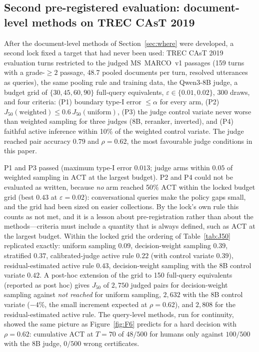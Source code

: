 \documentclass{article}
\newcommand{\eps}{\varepsilon}
\newcommand{\ACT}{\mathrm{ACT}}
\newcommand{\Jfifty}{J_{50}}
\begin{document}
\subsection{Second pre-registered evaluation: document-level methods on TREC CAsT 2019}
After the document-level methods of Section~\ref{sec:where} were developed, a second lock fixed a target that had never been used: TREC CAsT 2019 evaluation turns restricted to the judged MS~MARCO~v1 passages (159 turns with a grade-$\ge2$ passage, 48.7 pooled documents per turn, resolved utterances as queries), the same pooling rule and training data, the Qwen3-8B judge, a budget grid of $\{30,45,60,90\}$ full-query equivalents, $\eps\in\{0.01,0.02\}$, 300 draws, and four criteria: (P1) boundary type-I error $\le\alpha$ for every arm, (P2) $\Jfifty(\text{weighted})\le0.6\,\Jfifty(\text{uniform})$, (P3) the judge control variate never worse than weighted sampling for three judges (8B, reranker, inverted), and (P4) faithful active inference within 10\% of the weighted control variate. The judge reached pair accuracy $0.79$ and $\rho=0.62$, the most favourable judge conditions in this paper.

P1 and P3 passed (maximum type-I error $0.013$; judge arms within $0.05$ of weighted sampling in $\ACT$ at the largest budget). P2 and P4 could not be evaluated as written, because \emph{no} arm reached 50\% $\ACT$ within the locked budget grid (best $0.43$ at $\eps=0.02$): conversational queries make the policy gaps small, and the grid had been sized on easier collections. By the lock's own rule this counts as not met, and it is a lesson about pre-registration rather than about the methods---criteria must include a quantity that is always defined, such as $\ACT$ at the largest budget. Within the locked grid the ordering of Table~\ref{tab:J50} replicated exactly: uniform sampling $0.09$, decision-weight sampling $0.39$, stratified $0.37$, calibrated-judge active rule $0.22$ (with control variate $0.39$), residual-estimated active rule $0.43$, decision-weight sampling with the 8B control variate $0.42$. A post-hoc extension of the grid to 150 full-query equivalents (reported as post hoc) gives $\Jfifty$ of $2{,}750$ judged pairs for decision-weight sampling against \emph{not reached} for uniform sampling, $2{,}632$ with the 8B control variate ($-4\%$, the small increment expected at $\rho=0.62$), and $2{,}808$ for the residual-estimated active rule. The query-level methods, run for continuity, showed the same picture as Figure~\ref{fig:F6} predicts for a hard decision with $\rho=0.62$: cumulative $\ACT$ at $T=70$ of $48/500$ for humans only against $100/500$ with the 8B judge, $0/500$ wrong certificates.
\end{document}
